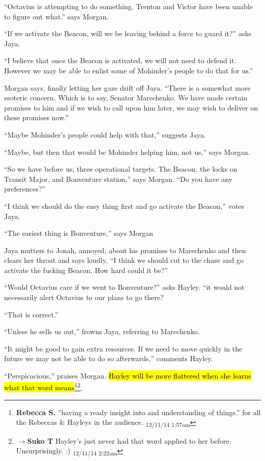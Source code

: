``Octavius is attempting to do something. Trenton and Victor have been unable to figure out what.'' says Morgan.

``If we activate the Beacon, will we be leaving behind a force to guard it?'' asks Jaya.

``I believe that once the Beacon is activated, we will not need to defend it. However we may be able to enlist some of Mohinder's people to do that for us.''



Morgan says, finally letting her gaze drift off Jaya. ``There is a somewhat more esoteric concern.  Which is to say, Senator Marechenko.  We have made certain promises to him and if we wish to call upon him later, we may wish to deliver on these promises now.''

``Maybe Mohinder's people could help with that,'' suggests Jaya.

``Maybe, but then that would be Mohinder helping him, not us,'' says Morgan.



``So we have before us, three operational targets.  The Beacon, the locks on Transit Major, and Bonventure station,'' says Morgan.  ``Do you have any preferences?''

``I think we should do the easy thing first and go activate the Beacon,'' votes Jaya.

``The easiest thing is Bonventure,'' says Morgan

Jaya mutters to Jonah, annoyed, about his promises to Marechenko and then clears her throat and says loudly, ``I think we should cut to the chase and go activate the fucking Beacon.  How hard could it be?''

``Would Octavius care if we went to Bonventure?'' asks Hayley.  ``it would not necessarily alert Octavius to our plans to go there?

``That is correct.''

``Unless he sells us out,'' frowns Jaya, referring to Marechenko.

``It might be good to gain extra resources.  If we need to move quickly in the future we may not be able to do so afterwards,'' comments Hayley.

``Perspicacious,'' praises Morgan.  \hl{Hayley will be more flattered when she learns what that word means}\footnote{\textbf{Rebecca S. }''having a ready insight into and understanding of things.'' for all the Rebeccas \& Hayleys in the audience. \textsubscript{12/11/14 1:57am}}\footnote{$\rightarrow$\textbf{Suko T }Hayley's just never had that word applied to her before.  Unsurprisingly. :) \textsubscript{12/11/14 2:22am}}.

